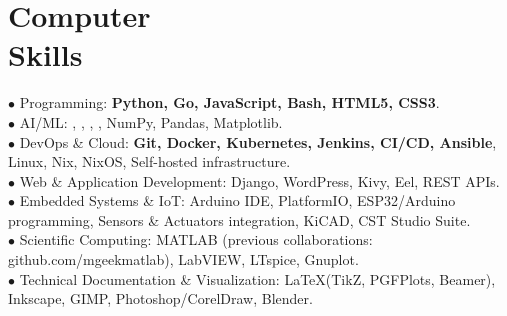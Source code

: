 \vspace{-2.5em}
\section{Computer\\Skills}
$\bullet$ Programming: \textbf{Python, Go, JavaScript, Bash, HTML5, CSS3}.\\
$\bullet$ AI/ML: , , , , NumPy, Pandas, Matplotlib.\\
$\bullet$ DevOps \& Cloud: \textbf{Git, Docker, Kubernetes, Jenkins, CI/CD, Ansible}, Linux, Nix, NixOS, Self-hosted infrastructure.\\
$\bullet$ Web \& Application Development: Django, WordPress, Kivy, Eel, REST APIs.\\
$\bullet$ Embedded Systems \& IoT: Arduino IDE, PlatformIO, ESP32/Arduino programming, Sensors \& Actuators integration, KiCAD, CST Studio Suite.\\
$\bullet$ Scientific Computing: MATLAB (previous collaborations: github.com/mgeekmatlab), LabVIEW, LTspice, Gnuplot.\\
$\bullet$ Technical Documentation \& Visualization: \LaTeX (TikZ, PGFPlots, Beamer), Inkscape, GIMP, Photoshop/CorelDraw, Blender.
\sectionline
